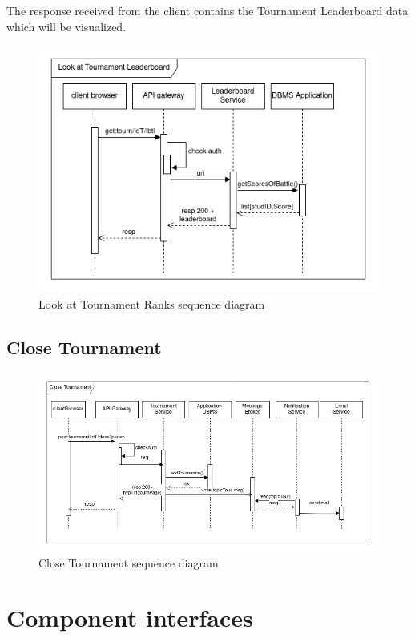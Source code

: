 The response received from the client contains the Tournament Leaderboard data which will be visualized.

\begin{figure}[H]
    \centering
    \includegraphics[width=1\linewidth]{misc//Images//UC/UC11.png}
    \caption{Look at Tournament Ranks sequence diagram}
    \label{fig:enter-label}
\end{figure}
\newpage
\subsection{Close Tournament}

\begin{figure}[H]
    \centering
    \includegraphics[width=1\linewidth]{misc//Images//UC/UC12.png}
    \caption{Close Tournament sequence diagram}
    \label{fig:enter-label}
\end{figure}
\newpage
\section{Component interfaces}

